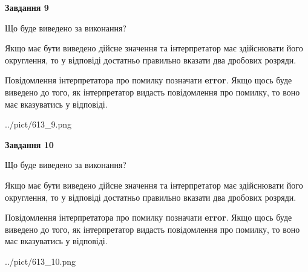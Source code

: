 \documentclass[12pt, ukrainian]{article}
\begin{document}
{\begin {Large}
{\begin {center}\textbf{Завдання 9}\end {center}}\par
Що буде виведено за виконання? \par

Якщо має бути виведено дійсне значення та інтерпретатор має здійснювати його округлення, 
то у відповіді достатньо правильно вказати два дробових розряди.

Повідомлення інтерпретатора про помилку позначати \textbf{error}.
Якщо щось буде виведено до того, як інтерпретатор видасть повідомлення про помилку, 
то воно має вказуватись у відповіді. \par

\begin{center}
	{../pict/613_9.png}
\end{center}
\newpage

{\begin {center}\textbf{Завдання 10}\end {center}}\par
Що буде виведено за виконання? \par

Якщо має бути виведено дійсне значення та інтерпретатор має здійснювати його округлення, 
то у відповіді достатньо правильно вказати два дробових розряди.

Повідомлення інтерпретатора про помилку позначати \textbf{error}.
Якщо щось буде виведено до того, як інтерпретатор видасть повідомлення про помилку, 
то воно має вказуватись у відповіді. \par

\begin{center}
	{../pict/613_10.png}
\end{center}
\newpage

\end {Large}}
\end{document}
